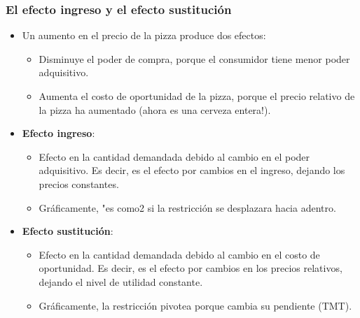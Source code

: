 \documentclass{beamer}
\begin{document}
\begin{frame}
\frametitle{El efecto ingreso y el efecto sustitución}
\begin{itemize}
    \item Un aumento en el precio de la pizza produce dos efectos:
    \begin{itemize}
        \item Disminuye el poder de compra, porque el consumidor tiene menor poder adquisitivo.
        \item Aumenta el costo de oportunidad de la pizza, porque el precio relativo de la pizza ha aumentado (ahora es una cerveza entera!).
    \end{itemize}
    \item \textbf{Efecto ingreso}: 
     \begin{itemize}
     \item Efecto en la cantidad demandada debido al cambio en el poder adquisitivo. Es decir, es el efecto por cambios en el ingreso, dejando los precios constantes.
     \item Gráficamente, "es como2 si la restricción se desplazara hacia adentro.
    \end{itemize}
     
    \item \textbf{Efecto sustitución}:
    \begin{itemize}
     \item Efecto en la cantidad demandada debido al cambio en el costo de oportunidad. Es decir, es el efecto por cambios en los precios relativos, dejando el nivel de utilidad constante.
     \item Gráficamente, la restricción pivotea porque cambia su pendiente (TMT).
    \end{itemize}
\end{itemize} 
\end{frame}
\end{document}
